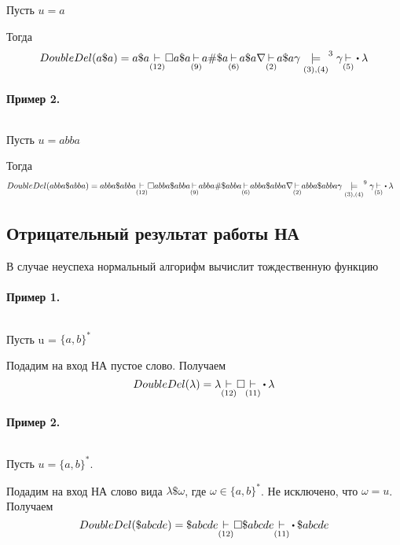 Пусть  $u = a$

Тогда
\begin{align*}
    DoubleDel(a\$a)
    = a\$a \underset{(12)}{\step} \square a\$a 
                      \underset{(9)}{\step} a\#\$a \underset{(6)}{\step} a\$ a\nabla
    \underset{(2)}{\step} a\$a\gamma \underset{(3),(4)}{\models}^{3} \gamma 
    \underset{(5)}{\step}\bigcdot \lambda
\end{align*}


\paragraph*{Пример 2.} ${}$\newline

Пусть $u = abba$

Тогда
\begin{align*}
    DoubleDel(abba\$abba)
    = abba\$abba \underset{(12)}{\step} \square abba\$abba \underset{(9)}{\step} abba\#\$abba
    \underset{(6)}{\step}
     & abba\$ abba\nabla \underset{(2)}{\step} abba\$abba\gamma
    \underset{(3),(4)}{\models}^{9} \gamma \underset{(5)}{\step}\bigcdot \lambda
\end{align*}

\subsection{Отрицательный результат работы НА}

В случае неуспеха нормальный алгорифм вычислит тождественную функцию

\paragraph*{Пример 1.} ${}$ \newline

Пусть u =  $\{a,b\}^{*}$ 

Подадим на вход НА пустое слово. Получаем
\[
    DoubleDel(\lambda) = \lambda \underset{(12)}{\step}
    \square \underset{(11)}{\step}\bigcdot \lambda
\] 

\paragraph*{Пример 2.} ${}$ \newline

Пусть $u = \{a,b\}^{*}$.

Подадим на вход НА слово вида $\lambda\$\omega$, где  $\omega \in \{a,b\}^{*}$. Не исключено,
что $\omega = u$. Получаем
\[
    DoubleDel(\$abcde) = \$abcde \underset{(12)}{\step} \square\$abcde 
    \underset{(11)}{\step}\bigcdot \$abcde
\] 

